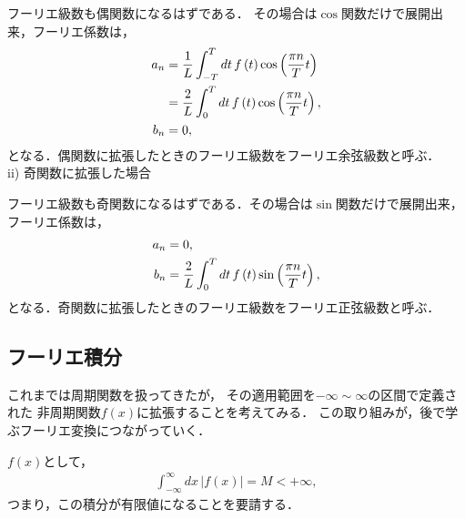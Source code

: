 フーリエ級数も偶関数になるはずである．
その場合は$\cos$関数だけで展開出来，フーリエ係数は，
\begin{align}
 a_n &= \dfrac{1}{L}\int_{-T}^{T}dt\,f\left(t\right)\cos\left(\dfrac{\pi n}{T}t\right) \notag \\
     &= \dfrac{2}{L}\int_{0}^{T}dt\, f\left(t\right)\cos\left(\dfrac{\pi n}{T}t\right), \\
 b_n & = 0, 
\end{align}
となる．偶関数に拡張したときのフーリエ級数をフーリエ余弦級数と呼ぶ．
\\
ii) 奇関数に拡張した場合

フーリエ級数も奇関数になるはずである．その場合は$\sin$関数だけで展開出来，
フーリエ係数は，
\begin{align}
  a_n & = 0, \notag \\
  b_n & = \dfrac{2}{L}\int_{0}^{T}dt\,f\left(t\right) \sin\left(\dfrac{\pi n}{T}t\right),
\end{align}
となる．奇関数に拡張したときのフーリエ級数をフーリエ正弦級数と呼ぶ．
%
%
%

\subsection{フーリエ積分}
%
これまでは周期関数を扱ってきたが，
その適用範囲を$-\infty\sim \infty$の区間で定義された
非周期関数$f(x)$に拡張することを考えてみる．
この取り組みが，後で学ぶフーリエ変換につながっていく．

$f(x)$として，
\begin{align}
 \int_{-\infty}^{\infty}dx\,\left|f\left(x\right)\right| = M < + \infty, 
\end{align}
つまり，この積分が有限値になることを要請する．

